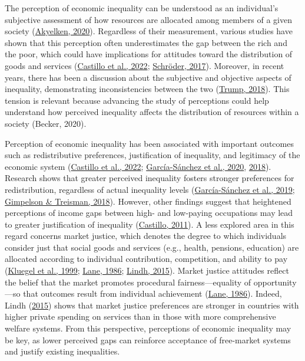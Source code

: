 \documentclass[
  12pt,
]{article}
\begin{document}
The perception of economic inequality can be understood as an
individual's subjective assessment of how resources are allocated among
members of a given society
(\protect\hyperlink{ref-akyelken_urban_2020}{Akyelken, 2020}).
Regardless of their measurement, various studies have shown that this
perception often underestimates the gap between the rich and the poor,
which could have implications for attitudes toward the distribution of
goods and services
(\protect\hyperlink{ref-castillo_perception_2022}{Castillo et al.,
2022}; \protect\hyperlink{ref-schroder_income_2017}{Schröder, 2017}).
Moreover, in recent years, there has been a discussion about the
subjective and objective aspects of inequality, demonstrating
inconsistencies between the two
(\protect\hyperlink{ref-trump_income_2018}{Trump, 2018}). This tension
is relevant because advancing the study of perceptions could help
understand how perceived inequality affects the distribution of
resources within a society (Becker, 2020).

Perception of economic inequality has been associated with important
outcomes such as redistributive preferences, justification of
inequality, and legitimacy of the economic system
(\protect\hyperlink{ref-castillo_perception_2022}{Castillo et al.,
2022};
\protect\hyperlink{ref-garcia-sanchez_attitudes_2020}{García-Sánchez et
al., 2020},
\protect\hyperlink{ref-garcia-sanchez_perceptions_2018}{2018}). Research
shows that greater perceived inequality fosters stronger preferences for
redistribution, regardless of actual inequality levels
(\protect\hyperlink{ref-garcia-sanchez_vicious_2019}{García-Sánchez et
al., 2019};
\protect\hyperlink{ref-gimpelson_misperceiving_2018}{Gimpelson \&
Treisman, 2018}). However, other findings suggest that heightened
perceptions of income gaps between high- and low-paying occupations may
lead to greater justification of inequality
(\protect\hyperlink{ref-Castillo2011}{Castillo, 2011}). A less explored
area in this regard concerns market justice, which denotes the degree to
which individuals consider just that social goods and services (e.g.,
health, pensions, education) are allocated according to individual
contribution, competition, and ability to pay
(\protect\hyperlink{ref-kluegel_legitimation_1999}{Kluegel et al.,
1999}; \protect\hyperlink{ref-lane_market_1986}{Lane, 1986};
\protect\hyperlink{ref-lindh_public_2015}{Lindh, 2015}). Market justice
attitudes reflect the belief that the market promotes procedural
fairness---equality of opportunity---so that outcomes result from
individual achievement (\protect\hyperlink{ref-lane_market_1986}{Lane,
1986}). Indeed, Lindh (\protect\hyperlink{ref-lindh_public_2015}{2015})
shows that market justice preferences are stronger in countries with
higher private spending on services than in those with more
comprehensive welfare systems. From this perspective, perceptions of
economic inequality may be key, as lower perceived gaps can reinforce
acceptance of free-market systems and justify existing inequalities.
\end{document}
